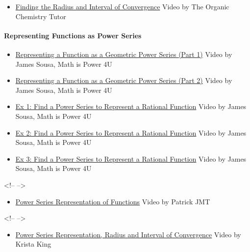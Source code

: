 \begin{itemize}
    \item \href{https://www.youtube.com/watch?v=EGni2-m5yxM}{Finding the Radius and Interval of Convergence} Video by The Organic Chemistry Tutor
\end{itemize}

\paragraph{Representing Functions as Power Series}



\begin{itemize}
    \item \href{https://www.youtube.com/watch?v=Sw7PcBTgE0A}{Representing a Function as a Geometric Power Series (Part 1)} Video by James Sousa, Math is Power 4U
    \item \href{https://www.youtube.com/watch?v=DyJetBjvT4M}{Representing a Function as a Geometric Power Series (Part 2)} Video by James Sousa, Math is Power 4U
    \item \href{https://www.youtube.com/watch?v=CIDaNHGcQ08}{Ex 1: Find a Power Series to Represent a Rational Function} Video by James Sousa, Math is Power 4U
    \item \href{https://www.youtube.com/watch?v=Ps06EgRs3tI}{Ex 2: Find a Power Series to Represent a Rational Function} Video by James Sousa, Math is Power 4U
    \item \href{https://www.youtube.com/watch?v=ALxAnRKG_1c}{Ex 3: Find a Power Series to Represent a Rational Function} Video by James Sousa, Math is Power 4U
\end{itemize}

<!-- -->



\begin{itemize}
    \item \href{https://www.youtube.com/watch?v=XWGPjZK0Yzw}{Power Series Representation of Functions} Video by Patrick JMT
\end{itemize}

<!-- -->



\begin{itemize}
    \item \href{https://www.youtube.com/watch?v=wrDo-4bwB-8}{Power Series Representation, Radius and Interval of Convergence} Video by Krista King
\end{itemize}

